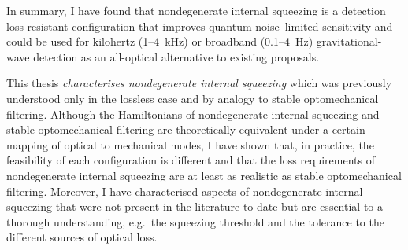 In summary, I have found that nondegenerate internal squeezing is a detection loss-resistant configuration that improves quantum noise--limited sensitivity and could be used for kilohertz (1--4~kHz) or broadband (0.1--4~Hz) gravitational-wave detection as an all-optical alternative to existing proposals.

This thesis \emph{characterises nondegenerate internal squeezing} which was previously understood only in the lossless case and by analogy to stable optomechanical filtering. Although the Hamiltonians of nondegenerate internal squeezing and stable optomechanical filtering are theoretically equivalent under a certain mapping of optical to mechanical modes, I have shown that, in practice, the feasibility of each configuration is different and that the loss requirements of nondegenerate internal squeezing are at least as realistic as stable optomechanical filtering. %
Moreover, I have characterised aspects of nondegenerate internal squeezing that were not present in the literature to date but are essential to a thorough understanding, e.g.\ the squeezing threshold and the tolerance to the different sources of optical loss.



